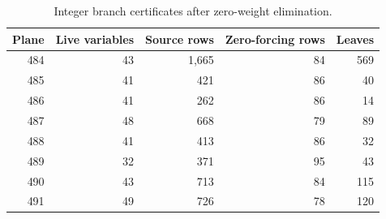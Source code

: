 \begin{table}[htbp]
\centering
\caption{Integer branch certificates after zero-weight elimination.}
\label{tab:branches}
\begin{tabular}{rrrrr}
\toprule
Plane & Live variables & Source rows & Zero-forcing rows & Leaves\\
\midrule
484 & 43 & 1{,}665 & 84 & 569\\
485 & 41 & 421 & 86 & 40\\
486 & 41 & 262 & 86 & 14\\
487 & 48 & 668 & 79 & 89\\
488 & 41 & 413 & 86 & 32\\
489 & 32 & 371 & 95 & 43\\
490 & 43 & 713 & 84 & 115\\
491 & 49 & 726 & 78 & 120\\
\bottomrule
\end{tabular}
\end{table}
